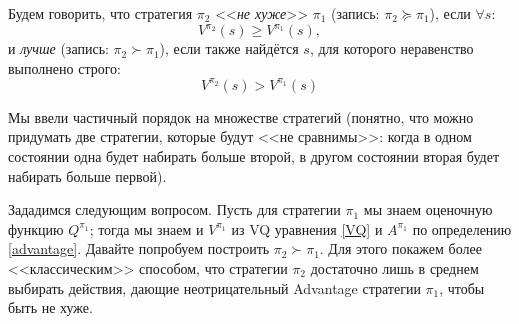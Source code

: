 \begin{definition}
Будем говорить, что стратегия $\pi_2$ <<\emph{не хуже}>> $\pi_1$ (запись: $\pi_2 \succeq \pi_1$), если $\forall s \colon$
$$V^{\pi_2}(s) \ge V^{\pi_1}(s),$$
и \emph{лучше} (запись: $\pi_2 \succ \pi_1$), если также найдётся $s$, для которого неравенство выполнено строго:
$$V^{\pi_2}(s) > V^{\pi_1}(s)$$
\end{definition}

Мы ввели частичный порядок на множестве стратегий (понятно, что можно придумать две стратегии, которые будут <<не сравнимы>>: когда в одном состоянии одна будет набирать больше второй, в другом состоянии вторая будет набирать больше первой).

Зададимся следующим вопросом. Пусть для стратегии $\pi_1$ мы знаем оценочную функцию $Q^{\pi_1}$; тогда мы знаем и $V^{\pi_1}$ из VQ уравнения \eqref{VQ} и $A^{\pi_1}$ по определению \eqref{advantage}. Давайте попробуем построить $\pi_2 \succ \pi_1$. Для этого покажем более <<классическим>> способом, что стратегии $\pi_2$ достаточно лишь в среднем выбирать действия, дающие неотрицательный Advantage стратегии $\pi_1$, чтобы быть не хуже.

